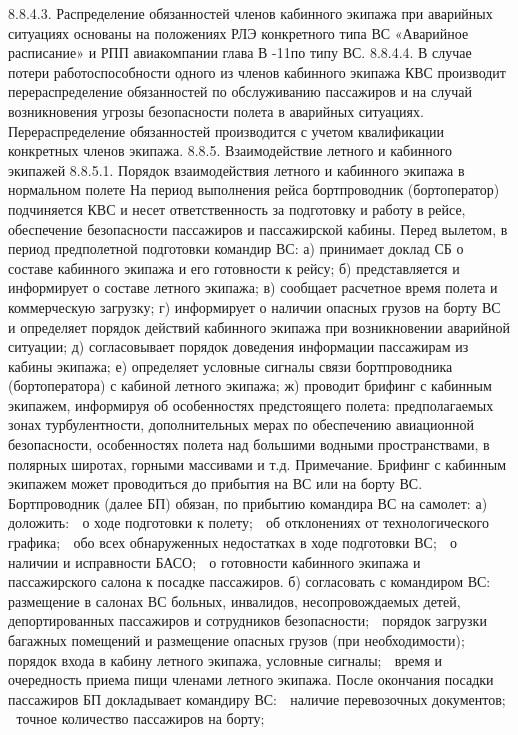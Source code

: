 8.8.4.3. Распределение обязанностей членов кабинного экипажа при аварийных ситуациях основаны на положениях РЛЭ конкретного типа ВС «Аварийное расписание» и РПП авиакомпании глава В -11по типу ВС.
8.8.4.4. В случае потери работоспособности одного из членов кабинного экипажа КВС производит перераспределение обязанностей по обслуживанию пассажиров и на случай возникновения угрозы безопасности полета в аварийных ситуациях.
Перераспределение обязанностей производится с учетом квалификации конкретных членов экипажа.
8.8.5. Взаимодействие летного и кабинного экипажей
8.8.5.1. Порядок взаимодействия летного и кабинного экипажа в нормальном полете
На период выполнения рейса бортпроводник (бортоператор) подчиняется КВС и несет ответственность за подготовку и работу в рейсе, обеспечение безопасности пассажиров и пассажирской кабины.
Перед вылетом, в период предполетной подготовки командир ВС:
а)	принимает доклад СБ о составе кабинного экипажа и его готовности к рейсу;
б)	представляется и информирует о составе летного экипажа;
в)	сообщает расчетное время полета и коммерческую загрузку;
г)	информирует о наличии опасных грузов на борту ВС и определяет порядок действий кабинного экипажа при возникновении аварийной ситуации;
д)	согласовывает порядок доведения информации пассажирам из кабины экипажа;
е)	определяет условные сигналы связи бортпроводника (бортоператора) с кабиной летного экипажа;
ж)	проводит брифинг с кабинным экипажем, информируя об особенностях предстоящего полета: предполагаемых зонах турбулентности, дополнительных мерах по обеспечению авиационной безопасности, особенностях полета над большими водными пространствами, в полярных широтах, горными массивами и т.д.
Примечание. Брифинг с кабинным экипажем может проводиться до прибытия на ВС или на борту ВС. 
Бортпроводник (далее БП) обязан, по прибытию командира ВС на самолет: 
а)	доложить:
	о ходе подготовки к полету;
	об отклонениях от технологического графика;
	обо всех обнаруженных недостатках в ходе подготовки ВС;
	о наличии и исправности БАСО;
	о готовности кабинного экипажа и пассажирского салона к посадке пассажиров.
б)	согласовать с командиром ВС:
	размещение в салонах ВС больных, инвалидов, несопровождаемых детей, депортированных пассажиров и сотрудников безопасности;
	порядок загрузки багажных помещений и размещение опасных грузов (при необходимости);
	порядок входа в кабину летного экипажа, условные сигналы;
	время и очередность приема пищи членами летного экипажа.
После окончания посадки пассажиров БП докладывает командиру ВС:
	наличие перевозочных документов;
	точное количество пассажиров на борту;
